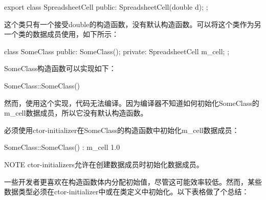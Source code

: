 \begin{cpp}
export class SpreadsheetCell
{
    public:
        SpreadsheetCell(double d);
};
\end{cpp}

这个类只有一个接受double的构造函数，没有默认构造函数。可以将这个类作为另一个类的数据成员使用，如下所示：

\begin{cpp}
class SomeClass
{
    public:
        SomeClass();
    private:
        SpreadsheetCell m_cell;
};
\end{cpp}

SomeClass构造函数可以实现如下：

\begin{cpp}
SomeClass::SomeClass() { }
\end{cpp}

然而，使用这个实现，代码无法编译。因为编译器不知道如何初始化SomeClass的m\_cell数据成员，所以它没有默认构造函数。

必须使用ctor-initializer在SomeClass的构造函数中初始化m\_cell数据成员：

\begin{cpp}
SomeClass::SomeClass() : m_cell { 1.0 } { }
\end{cpp}

\begin{myNotic}{NOTE}
ctor-initializers允许在创建数据成员时初始化数据成员。
\end{myNotic}

一些开发者更喜欢在构造函数体内分配初始值，尽管这可能效率较低。然而，某些数据类型必须在ctor-initializer中或在类定义中初始化。以下表格做了个总结：

